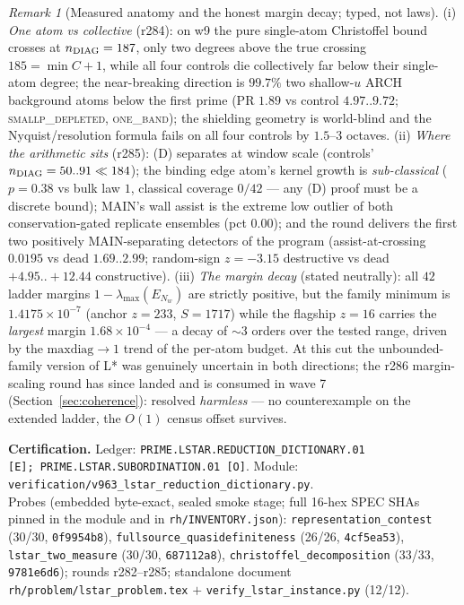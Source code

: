 \documentclass[11pt]{article}
\newcommand{\certbox}[3]{%
  \par\medskip\noindent\colorbox{certgray}{\parbox{\dimexpr\linewidth-2\fboxsep}{%
    \footnotesize\raggedright\textbf{Certification.} Ledger: \texttt{#1}.\quad
    Module: \texttt{#2}.\\ #3}}\par\medskip}
\theoremstyle{definition}
\theoremstyle{remark}
\newtheorem{remark}[theorem]{Remark}
\begin{document}
\begin{remark}[Measured anatomy and the honest margin decay; typed,
not laws]\label{rem:lstar-measured}
(i) \emph{One atom vs collective} (r284): on w9 the pure single-atom
Christoffel bound crosses at $n_{\rm DIAG}=187$, only two degrees above
the true crossing $185=\min C+1$, while all four controls die
collectively far below their single-atom degree; the near-breaking
direction is $99.7\%$ two shallow-$u$ ARCH background atoms below the
first prime (PR $1.89$ vs control $4.97..9.72$;
\textsc{smallp\_depleted}, \textsc{one\_band}); the shielding geometry
is world-blind and the Nyquist/resolution formula fails on all four
controls by $1.5$--$3$ octaves.  (ii) \emph{Where the arithmetic sits}
(r285): (D) separates at window scale (controls' $n_{\rm DIAG}=50..91
\ll184$); the binding edge atom's kernel growth is \emph{sub-classical}
($p=0.38$ vs bulk law $1$, classical coverage $0/42$ --- any (D) proof
must be a discrete bound); MAIN's wall assist is the extreme low
outlier of both conservation-gated replicate ensembles (pct $0.00$);
and the round delivers the first two positively MAIN-separating
detectors of the program (assist-at-crossing $0.0195$ vs dead
$1.69..2.99$; random-sign $z=-3.15$ destructive vs dead
$+4.95..+12.44$ constructive).  (iii) \emph{The margin decay} (stated
neutrally): all $42$ ladder margins $1-\lambda_{\max}(E_{N_w})$ are
strictly positive, but the family minimum is $1.4175\times10^{-7}$
(anchor $z=233$, $S=1717$) while the flagship $z=16$ carries the
\emph{largest} margin $1.68\times10^{-4}$ --- a decay of $\sim$3
orders over the tested range, driven by the $\mathrm{maxdiag}\to1$
trend of the per-atom budget.  At this cut the unbounded-family
version of L* was genuinely uncertain in both directions; the r286
margin-scaling round has since landed and is consumed in wave 7
(Section~\ref{sec:coherence}): resolved \emph{harmless} --- no
counterexample on the extended ladder, the $O(1)$ census offset
survives.
\end{remark}

\certbox{PRIME.LSTAR.REDUCTION\_DICTIONARY.01 [E];\
PRIME.LSTAR.SUBORDINATION.01 [O]}%
{verification/v963\_lstar\_reduction\_dictionary.py}%
{Probes (embedded byte-exact, sealed smoke stage; full 16-hex SPEC SHAs
pinned in the module and in \texttt{rh/INVENTORY.json}):
\texttt{representation\_contest} (30/30, \texttt{0f9954b8}),
\texttt{fullsource\_quasidefiniteness} (26/26, \texttt{4cf5ea53}),
\texttt{lstar\_two\_measure} (30/30, \texttt{687112a8}),
\texttt{christoffel\_decomposition} (33/33, \texttt{9781e6d6});
rounds r282--r285; standalone document
\texttt{rh/problem/lstar\_problem.tex} $+$
\texttt{verify\_lstar\_instance.py} (12/12).}
\end{document}

